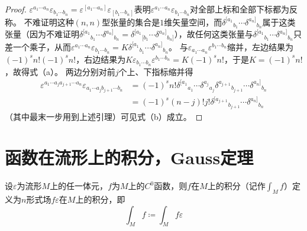 \begin{proof}
    $\varepsilon^{a_1 \cdots a_n}\varepsilon_{b_1 \cdots b_n} = \varepsilon^{[a_1 \cdots a_n]}\varepsilon_{[b_1 \cdots b_n]}$表明$\varepsilon^{a_1 \cdots a_n}\varepsilon_{b_1 \cdots b_n}$对全部上标和全部下标都为反称。
    不难证明这种$(n, n)$型张量的集合是$1$维矢量空间，而$\delta^{[a_1}{}_{b_1} \cdots \delta^{a_n]}{}_{b_n}$属于这类张量（因为不难证明$\delta^{[a_1}{}_{b_1} \cdots \delta^{a_n]}{}_{b_n} = \delta^{[a_1}{}_{[b_1} \cdots \delta^{a_n]}{}_{b_n]}$），故任何这类张量与$\delta^{[a_1}{}_{b_1} \cdots \delta^{a_n]}{}_{b_n}$只差一个乘子，从而$\varepsilon^{a_1 \cdots a_n}\varepsilon_{b_1 \cdots b_n} = K\delta^{[a_1}{}_{b_1} \cdots \delta^{a_n]}{}_{b_n}$。
    与$\varepsilon_{a_1 \cdots a_n}\varepsilon^{b_1 \cdots b_n}$缩并，左边结果为$(-1)^sn!(-1)^sn!$，右边结果为$K\varepsilon_{b_1 \cdots b_n}\varepsilon^{b_1 \cdots b_n} = K(-1)^sn!$，于是$K = (-1)^sn!$，故得式（a）。
    两边分别对前$j$个上、下指标缩并得
    \[\begin{split}
        \varepsilon^{a_1 \cdots a_j a_{j + 1} \cdots a_n}\varepsilon_{a_1 \cdots a_j b_{j + 1} \cdots b_n} & = (-1)^sn!\delta^{[a_1}{}_{a_1} \cdots \delta^{a_j}{}_{a_j}\delta^{a_{j + 1}}{}_{b_{j + 1}} \cdots \delta^{a_n]}{}_{b_n} \\
        & = (-1)^s(n - j)!j!\delta^{[a_{j + 1}}{}_{b_{j + 1}} \cdots \delta^{a_n]}{}_{b_n}
    \end{split}\]
    （其中最末一步用到上述引理）可见式（b）成立。
\end{proof}

\section{函数在流形上的积分，Gauss定理}

\begin{definition}
    设$\varepsilon$为流形$M$上的任一体元，$f$为$M$上的$C^0$函数，则$f$在$M$上的积分（记作$\displaystyle\int_Mf$）定义为$n$形式场$f\varepsilon$在$M$上的积分，即
    $$\int_Mf \coloneq \int_Mf\varepsilon$$
\end{definition}

